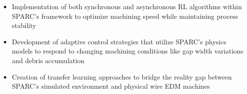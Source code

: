 \documentclass[5p,times,procedia]{elsarticle}
\begin{document}
\begin{itemize}
    \item Implementation of both synchronous and asynchronous RL algorithms within SPARC's framework to optimize machining speed while maintaining process stability
    \item Development of adaptive control strategies that utilize SPARC's physics models to respond to changing machining conditions like gap width variations and debris accumulation
    \item Creation of transfer learning approaches to bridge the reality gap between SPARC's simulated environment and physical wire EDM machines
\end{itemize}




\clearpage\onecolumn
\end{document}
